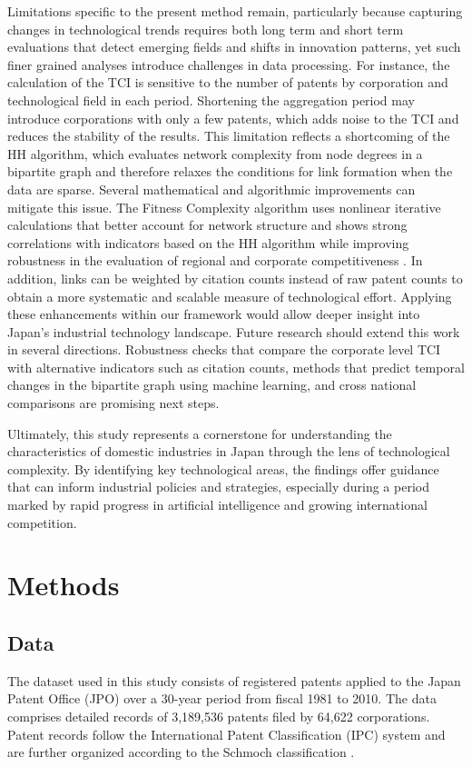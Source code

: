 \documentclass[fleqn,10pt]{wlscirep}
\begin{document}
Limitations specific to the present method remain, particularly because capturing changes in technological trends requires both long term and short term evaluations that detect emerging fields and shifts in innovation patterns, yet such finer grained analyses introduce challenges in data processing.  
For instance, the calculation of the TCI is sensitive to the number of patents by corporation and technological field in each period.  
Shortening the aggregation period may introduce corporations with only a few patents, which adds noise to the TCI and reduces the stability of the results\cite{PintarEssletzbichler2022}.  
This limitation reflects a shortcoming of the HH algorithm, which evaluates network complexity from node degrees in a bipartite graph and therefore relaxes the conditions for link formation when the data are sparse.  
Several mathematical and algorithmic improvements can mitigate this issue.  
The Fitness Complexity algorithm \cite{Tacchella2012} uses nonlinear iterative calculations that better account for network structure and shows strong correlations with indicators based on the HH algorithm while improving robustness in the evaluation of regional and corporate competitiveness \cite{Wu2016,Albeaik2017}.  
In addition, links can be weighted by citation counts instead of raw patent counts to obtain a more systematic and scalable measure of technological effort.  
Applying these enhancements within our framework would allow deeper insight into Japan's industrial technology landscape.  
Future research should extend this work in several directions.  
Robustness checks that compare the corporate level TCI with alternative indicators such as citation counts, methods that predict temporal changes in the bipartite graph using machine learning, and cross national comparisons are promising next steps.

Ultimately, this study represents a cornerstone for understanding the characteristics of domestic industries in Japan through the lens of technological complexity.  
By identifying key technological areas, the findings offer guidance that can inform industrial policies and strategies, especially during a period marked by rapid progress in artificial intelligence and growing international competition.  


\section*{Methods} \label{section:Methods}
\subsection*{Data} \label{subsection:Data}
The dataset used in this study consists of registered patents applied to the Japan Patent Office (JPO) over a 30-year period from fiscal 1981 to 2010. The data comprises detailed records of 3,189,536 patents filed by 64,622 corporations. Patent records follow the International Patent Classification (IPC) system and are further organized according to the Schmoch classification \cite{Schmoch2008}. 
\end{document}
